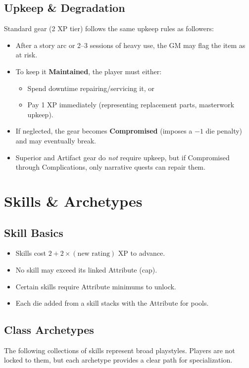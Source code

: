 \documentclass[12pt]{article}
\begin{document}
\subsection*{Upkeep \& Degradation}
Standard gear (2 XP tier) follows the same upkeep rules as followers:
\begin{itemize}
  \item After a story arc or 2--3 sessions of heavy use, the GM may flag the item as at risk.
  \item To keep it \textbf{Maintained}, the player must either:
  \begin{itemize}
    \item Spend downtime repairing/servicing it, or
    \item Pay 1 XP immediately (representing replacement parts, masterwork upkeep).
  \end{itemize}
  \item If neglected, the gear becomes \textbf{Compromised} (imposes a $-1$ die penalty) and may eventually break.
  \item Superior and Artifact gear do \emph{not} require upkeep, but if Compromised through Complications, only narrative quests can repair them.
\end{itemize}

\section{Skills \& Archetypes}

\subsection{Skill Basics}
\begin{itemize}
  \item Skills cost $2 + 2 \times (\text{new rating})$ XP to advance.
  \item No skill may exceed its linked Attribute (cap).
  \item Certain skills require Attribute minimums to unlock.
  \item Each die added from a skill stacks with the Attribute for pools.
\end{itemize}

\subsection{Class Archetypes}
The following collections of skills represent broad playstyles. Players are not locked to them, but each archetype provides a clear path for specialization.
\end{document}
